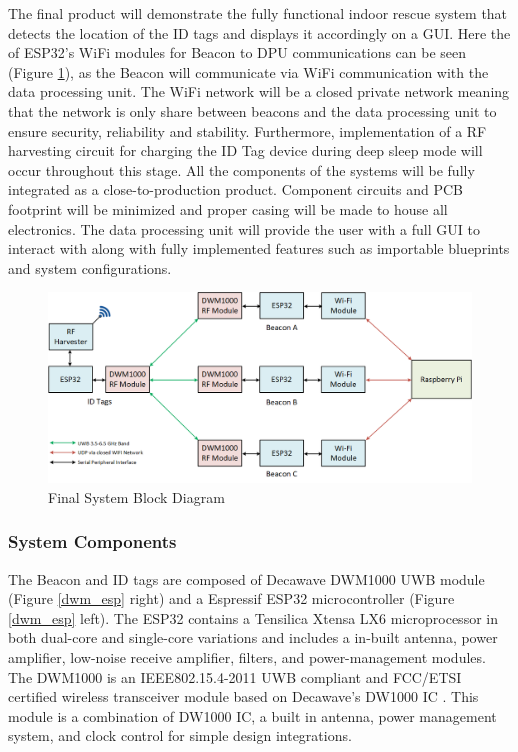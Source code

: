 The final product will demonstrate the fully functional indoor rescue system that detects the location of the ID tags and displays it accordingly on a GUI. Here the of ESP32’s WiFi modules for Beacon to DPU communications can be seen (Figure \ref{final}), as the Beacon will communicate via WiFi communication with the data processing unit. The WiFi network will be a closed private network meaning that the network is only share between beacons and the data processing unit to ensure security, reliability and stability. Furthermore, implementation of a RF harvesting circuit for charging the ID Tag device during deep sleep mode will occur throughout this stage. All the components of the systems will be fully integrated as a close-to-production product. Component circuits and {PCB} footprint will be minimized and proper casing will be made to house all electronics. The data processing unit will provide the user with a full GUI to interact with along with fully implemented features such as importable blueprints and system configurations.

\bigskip
\begin{figure}[H]
\centering
    \includegraphics[width=\linewidth]{./images/03_final.png}
    \caption{Final System Block Diagram}
    \label{final}
\end{figure}

\pagebreak
\subsubsection{System Components}
\medskip
The Beacon and ID tags are composed of Decawave DWM1000 \Gls{UWB} module (Figure \ref{dwm_esp} right) and a Espressif ESP32 microcontroller (Figure \ref{dwm_esp} left). The ESP32 contains a Tensilica Xtensa LX6 microprocessor in both dual-core and single-core variations and includes a in-built antenna, power amplifier, low-noise receive amplifier, filters, and power-management modules. The DWM1000 is an IEEE802.15.4-2011 UWB compliant and \Gls{FCC}/\Gls{ETSI} certified wireless transceiver module based on Decawave’s DW1000 IC \cite{R2-1-1-1}. This module is a combination of DW1000 IC, a built in antenna, power management system, and clock control for simple design integrations. 

